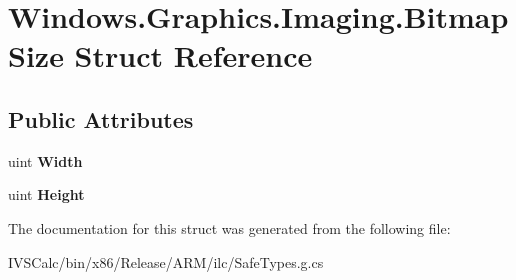 \hypertarget{struct_windows_1_1_graphics_1_1_imaging_1_1_bitmap_size}{}\section{Windows.\+Graphics.\+Imaging.\+Bitmap\+Size Struct Reference}
\label{struct_windows_1_1_graphics_1_1_imaging_1_1_bitmap_size}
\subsection*{Public Attributes}
\begin{DoxyCompactItemize}
\item 
\mbox{\label{struct_windows_1_1_graphics_1_1_imaging_1_1_bitmap_size_a4950819635d3f238ad126497837647d8}} 
uint {\bfseries Width}
\item 
\mbox{\label{struct_windows_1_1_graphics_1_1_imaging_1_1_bitmap_size_a5b07f3acb9cdf82096594a1b1362990b}} 
uint {\bfseries Height}
\end{DoxyCompactItemize}


The documentation for this struct was generated from the following file\+:\begin{DoxyCompactItemize}
\item 
I\+V\+S\+Calc/bin/x86/\+Release/\+A\+R\+M/ilc/Safe\+Types.\+g.\+cs\end{DoxyCompactItemize}
